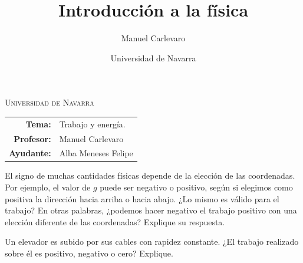 \documentclass[11pt]{article}
\title{Introducción a la física}
\author{Manuel Carlevaro}
\date{Universidad de Navarra}
\begin{document}

\begin{center}
\end{center} 

\begin{center}
\vspace{1em}
\Large{\textsc{Universidad de Navarra}} 
\end{center}

 \vspace{1em}

\begin{center}
\begin{tabular}{r l}
 \textbf{Tema:} & Trabajo y energía.\\
 \textbf{Profesor:} & Manuel Carlevaro \\
 \textbf{Ayudante:} & Alba Meneses Felipe
\end{tabular}\end{center}

\vspace{2em}

\begin{exercise}
    El signo de muchas cantidades físicas depende de la elección de las coordenadas. Por ejemplo, el valor de $g$ puede ser negativo o positivo, según si elegimos como positiva la dirección hacia arriba o hacia abajo. ¿Lo mismo es válido para el trabajo? En otras palabras, ¿podemos hacer negativo el trabajo positivo con una elección diferente de las coordenadas? Explique su respuesta.
\end{exercise}

\begin{exercise}
    Un elevador es subido por sus cables con rapidez constante. ¿El trabajo realizado sobre él es positivo, negativo o cero? Explique.
\end{exercise}
\end{document}

